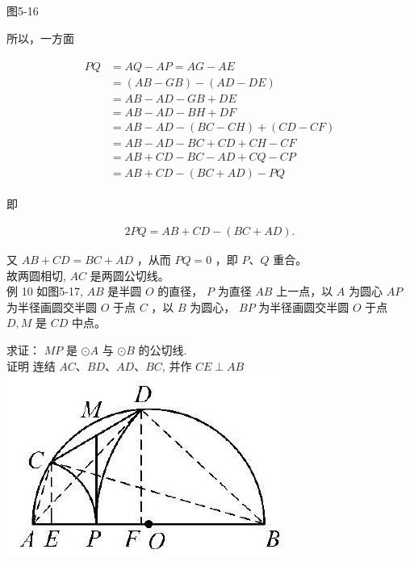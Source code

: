 \documentclass[10pt]{article}
\begin{document}
图5-16

所以，一方面

\begin{align*}
\begin{aligned}
P Q & =A Q-A P=A G-A E \\
& =(A B-G B)-(A D-D E) \\
& =A B-A D-G B+D E \\
& =A B-A D-B H+D F \\
& =A B-A D-(B C-C H)+(C D-C F) \\
& =A B-A D-B C+C D+C H-C F \\
& =A B+C D-B C-A D+C Q-C P \\
& =A B+C D-(B C+A D)-P Q
\end{aligned}
\end{align*}

即

\begin{align*}
2 P Q=A B+C D-(B C+A D) .
\end{align*}

又 $A B+C D=B C+A D$ ，从而 $P Q=0$ ，即 $P 、 Q$ 重合。\\
故两圆相切, $A C$ 是两圆公切线。\\
例 10 如图5-17, $A B$ 是半圆 $O$ 的直径， $P$ 为直径 $A B$ 上一点，以 $A$ 为圆心 $A P$ 为半径画圆交半圆 $O$ 于点 $C$ ，以 $B$ 为圆心， $B P$ 为半径画圆交半圆 $O$ 于点 $D, M$ 是 $C D$ 中点。

求证： $M P$ 是 $\odot A$ 与 $\odot B$ 的公切线.\\
证明 连结 $A C 、 B D 、 A D 、 B C$, 并作 $C E \perp A B$\\
\includegraphics[max width=\textwidth, center]{2024_10_30_66b8e5e701da2093c133g-040(1)}
\end{document}
